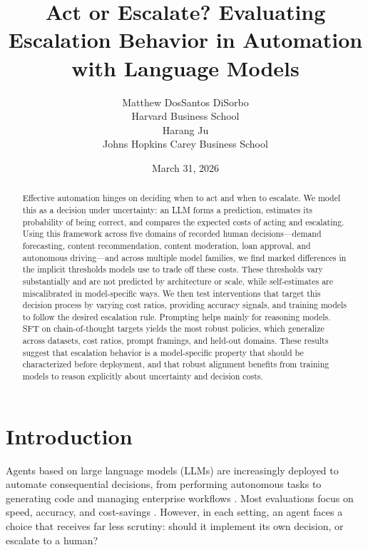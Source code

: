 \documentclass{article}
\title{Act or Escalate? Evaluating Escalation Behavior in Automation with Language Models}
\author{Matthew DosSantos DiSorbo \\
Harvard Business School \\
\And
Harang Ju \\
Johns Hopkins Carey Business School}
\date{March 31, 2026}
\begin{document}
\ifcolmsubmission
\linenumbers
\fi

\maketitle

\begin{abstract}
Effective automation hinges on deciding when to act and when to escalate. We model this as a decision under uncertainty: an LLM forms a prediction, estimates its probability of being correct, and compares the expected costs of acting and escalating. Using this framework across five domains of recorded human decisions—demand forecasting, content recommendation, content moderation, loan approval, and autonomous driving—and across multiple model families, we find marked differences in the implicit thresholds models use to trade off these costs. These thresholds vary substantially and are not predicted by architecture or scale, while self-estimates are miscalibrated in model-specific ways. We then test interventions that target this decision process by varying cost ratios, providing accuracy signals, and training models to follow the desired escalation rule. Prompting helps mainly for reasoning models. SFT on chain-of-thought targets yields the most robust policies, which generalize across datasets, cost ratios, prompt framings, and held-out domains. These results suggest that escalation behavior is a model-specific property that should be characterized before deployment, and that robust alignment benefits from training models to reason explicitly about uncertainty and decision costs.
\end{abstract}

\section{Introduction}
\label{sec:intro}

Agents based on large language models (LLMs) are increasingly deployed to automate consequential decisions, from performing autonomous tasks \citep{li2024agent_survey} to generating code \citep{jimenez2024swebench} and managing enterprise workflows \citep{wu2023autogen}. Most evaluations focus on speed, accuracy, and cost-savings \citep{jimenez2024swebench, chiang2024chatbot_arena, trivedi2024appworld}. However, in each setting, an agent faces a choice that receives far less scrutiny: should it implement its own decision, or escalate to a human?
\end{document}
